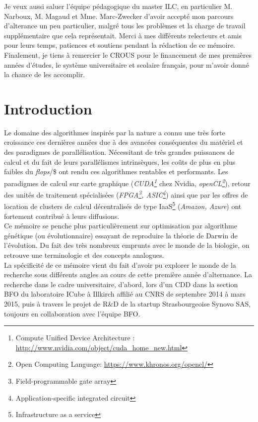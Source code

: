 \documentclass[french, 11pt]{memoir}
\begin{document}
\bigskip
Je veux aussi saluer l'équipe
pédagogique du master ILC, en particulier M. Narboux, M. Magaud et Mme.
Marc-Zwecker d'avoir accepté mon parcours d'alterance un peu
particulier, malgré tous les problèmes et la charge de travail
supplémentaire que cela
représentait.
Merci à mes différents relecteurs et amis pour leurs temps,
patiences et soutiens pendant la rédaction de ce mémoire. Finalement, je
tiens à remercier le CROUS pour le financement de mes premières années
d'études, le système universitaire et scolaire français, pour m'avoir
donné la chance de les
accomplir.
\newpage

\section{Introduction}\label{introduction}

Le domaine des algorithmes inspirés par la nature a connu une très forte
croissance ces dernières années due à des avancées conséquentes du
matériel et des paradigmes de parallélisation. Nécessitant de très
grandes puissances de calcul et du fait de leurs parallélismes
intrinsèques, les coûts de plus en plus faibles du \emph{flops}/\$ ont
rendu ces algorithmes rentables et performants. Les paradigmes de calcul
sur carte graphique (\emph{CUDA\footnote{Compute Unified Device Architecture : \url{http://www.nvidia.com/object/cuda_home_new.html}}} chez Nvidia, \emph{openCL\footnote{Open Computing Language: \url{https://www.khronos.org/opencl/}}}), retour des
unités de traitement spécialisées (\emph{FPGA\footnote{Field-programmable gate array}, ASIC\footnote{Application-specific integrated circuit}}) ainsi que par les
offres de location de clusters de calcul décentralisés de type IaaS\footnote{Infrastructure as a service}
(\emph{Amazon, Azure}) ont fortement contribué à leurs diffusions. \\
Ce mémoire se penche plus particulièrement sur optimisation par
algorithme génétique (ou évolutionnaire) essayant de reproduire la
théorie de Darwin de l'évolution. Du fait des très nombreux emprunts
avec le monde de la biologie, on retrouve une terminologie et des
concepts analogues. \\
La spécificité de ce mémoire vient du fait d'avoir pu explorer le monde
de la recherche sous différents angles au cours de cette première année
d'alternance. La recherche dans le cadre universitaire, d'abord, lors
d'un CDD dans la section BFO du laboratoire ICube à Illkirch affilié au
CNRS de septembre 2014 à mars 2015, puis à travers le projet de R\&D de
la startup Strasbourgeoise Synovo SAS, toujours en collaboration avec
l'équipe BFO. 
\end{document}
